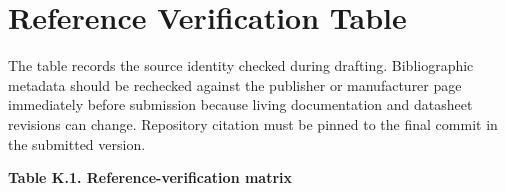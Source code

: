 \chapter{Reference Verification Table}\label{ch:reference-verification-table}

The table records the source identity checked during drafting.
Bibliographic metadata should be rechecked against the publisher or
manufacturer page immediately before submission because living
documentation and datasheet revisions can change. Repository citation
\cite{zephyr_repo} must be pinned to the final commit in the submitted version.

\par\medskip\noindent\singlespacing
{}
\textbf{Table K.1. Reference-verification matrix}\par


